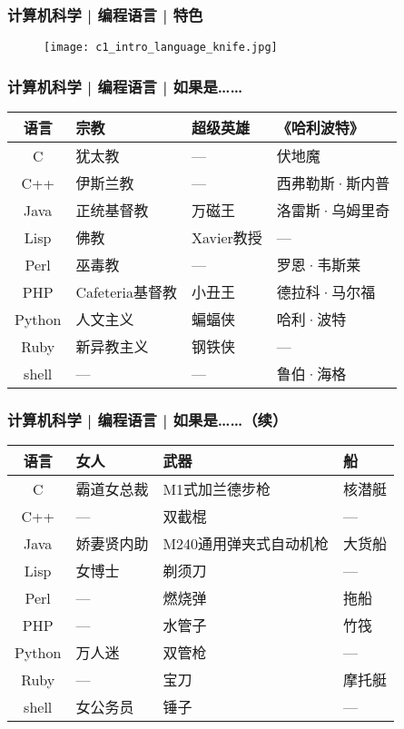 \begin{frame}
  \frametitle{计算机科学 | 编程语言 | 特色}
  \begin{figure}
    \centering
    \texttt{[image: c1\_intro\_language\_knife.jpg]}
  \end{figure}
\end{frame}

\begin{frame}
  \frametitle{计算机科学 | 编程语言 | 如果是……}
  \begin{table}
    \centering
    \begin{tabular}{clll}
      \hline
      \rowcolor{blue!50}语言 & 宗教 & 超级英雄 & 《哈利波特》\\
      \hline
      C & 犹太教 & --- & 伏地魔\\
      C++ & 伊斯兰教 & --- & 西弗勒斯·斯内普\\
      Java & 正统基督教 & 万磁王 & 洛雷斯·乌姆里奇\\
      Lisp & 佛教 & Xavier教授 & ---\\
      Perl & 巫毒教 & --- & 罗恩·韦斯莱\\
      PHP & Cafeteria基督教 & 小丑王 & 德拉科·马尔福\\
      Python & 人文主义 & 蝙蝠侠 & 哈利·波特\\
      Ruby & 新异教主义 & 钢铁侠 & ---\\
      shell & --- & --- & 鲁伯·海格\\
      \hline
    \end{tabular}
  \end{table}
\end{frame}

\begin{frame}
  \frametitle{计算机科学 | 编程语言 | 如果是……（续）}
  \begin{table}
    \centering
    \begin{tabular}{clll}
      \hline
      \rowcolor{blue!50}语言 & 女人 & 武器 & 船\\
      \hline
      C & 霸道女总裁 & M1式加兰德步枪 & 核潜艇\\
      C++ & --- & 双截棍 & ---\\
      Java & 娇妻贤内助 & M240通用弹夹式自动机枪 & 大货船\\
      Lisp & 女博士 & 剃须刀 & ---\\
      Perl & --- & 燃烧弹 & 拖船\\
      PHP & --- & 水管子 & 竹筏\\
      Python & 万人迷 & 双管枪 & ---\\
      Ruby & --- & 宝刀 & 摩托艇\\
      shell & 女公务员 & 锤子 & ---\\
      \hline
    \end{tabular}
  \end{table}
\end{frame}

